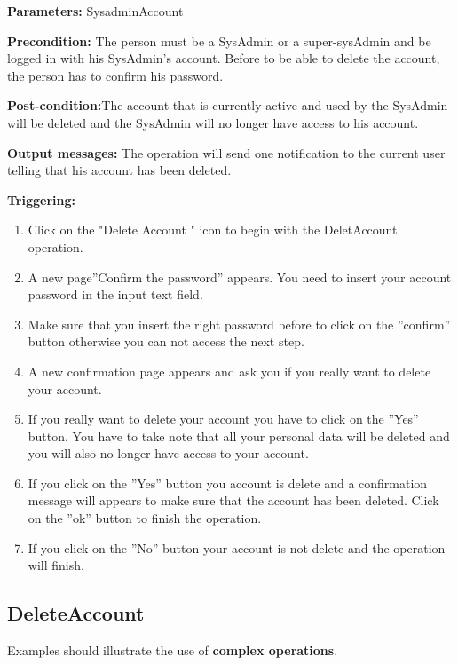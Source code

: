 \begin{description}

\item \textbf{Parameters:} SysadminAccount
\item \textbf{Precondition:} The person must be a SysAdmin or a super-sysAdmin
and be logged in with his SysAdmin's account. Before to be able to delete the
account, the person has to confirm his password.
\item \textbf{Post-condition:}The account that is currently active and used by
the SysAdmin will be deleted and the SysAdmin will no longer have access to his
account.
\item \textbf{Output messages:} The operation will send one notification to the
current user telling that his account has been deleted.


\item \textbf{Triggering:}
\begin{enumerate}
\item Click on the "Delete Account " icon to begin with the DeletAccount
operation.
\item A new page''Confirm the password'' appears. You need to insert your
account password in the input text field. 
\item Make sure that you insert the right password before to click on the
''confirm'' button otherwise you can not access the next step.
\item A new confirmation page appears and ask you if you really want to delete
your account.
\item If you really want to delete your account you have to click on the
''Yes'' button. You have to take note that all your personal data will be
deleted and you will also no longer have access to your account.
\item If you click on the ''Yes'' button you account is delete and a
confirmation message will appears to make sure that the account has been
deleted. Click on the ''ok'' button to finish the operation.
\item If you click on the ''No'' button your account is not delete and the
operation will finish.
\end{enumerate}

 
\end{description}

 
\subsection{DeleteAccount}
Examples should illustrate the use of \textbf{complex operations}.

